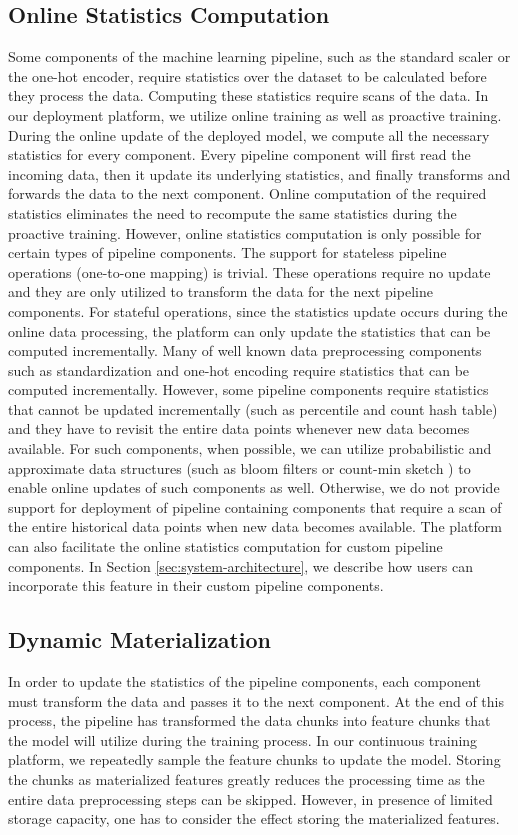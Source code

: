 \subsection{Online Statistics Computation}\label{online-statistics-computation}
Some components of the machine learning pipeline, such as the standard scaler or the one-hot encoder, require statistics over the dataset to be calculated before they process the data.
Computing these statistics require scans of the data.
In our deployment platform, we utilize online training as well as proactive training.
During the online update of the deployed model, we compute all the necessary statistics for every component.
Every pipeline component will first read the incoming data, then it update its underlying statistics, and finally transforms and forwards the data to the next component.
Online computation of the required statistics eliminates the need to recompute the same statistics during the proactive training.
However, online statistics computation is only possible for certain types of pipeline components.
The support for stateless pipeline operations (one-to-one mapping) is trivial.
These operations require no update and they are only utilized to transform the data for the next pipeline components.
For stateful operations, since the statistics update occurs during the online data processing, the platform can only update the statistics that can be computed incrementally.
Many of well known data preprocessing components such as standardization and one-hot encoding require statistics that can be computed incrementally.
However, some pipeline components require statistics that cannot be updated incrementally (such as percentile and count hash table) and they have to revisit the entire data points whenever new data becomes available.
For such components, when possible, we can utilize probabilistic and approximate data structures (such as bloom filters or count-min sketch \cite{cormode2005improved}) to enable online updates of such components as well.
Otherwise, we do not provide support for deployment of pipeline containing components that require a scan of the entire historical data points when new data becomes available.
The platform can also facilitate the online statistics computation for custom pipeline components.
In Section \ref{sec:system-architecture}, we describe how users can incorporate this feature in their custom pipeline components.

\subsection{Dynamic Materialization}
In order to update the statistics of the pipeline components, each component must transform the data and passes it to the next component.
At the end of this process, the pipeline has transformed the data chunks into feature chunks that the model will utilize during the training process.
In our continuous training platform, we repeatedly sample the feature chunks to update the model.
Storing the chunks as materialized features greatly reduces the processing time as the entire data preprocessing steps can be skipped.
However, in presence of limited storage capacity, one has to consider the effect storing the materialized  features.

